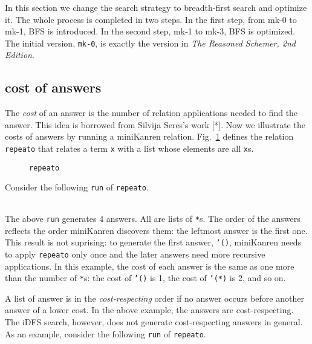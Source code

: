 \documentclass[format=acmlarge, review=true, authordraft=true]{acmart}
\begin{document}
In this section we change the search strategy to breadth-first search and optimize it. The whole process is completed in two steps. In the first step, from mk-0 to mk-1, BFS is introduced. In the second step, mk-1 to mk-3, BFS is optimized. The initial version, \texttt{mk-0}, is exactly the version in \emph{The Reasoned Schemer, 2nd Edition}.



\subsection{cost of answers}


The \emph{cost} of an answer is the number of relation applications needed to
find the answer. This idea is borrowed from Silvija Seres's work [*].
Now we illustrate the costs of answers by running a miniKanren relation.
Fig.~\ref{def-repeato} defines the relation \texttt{repeato} that 
relates a term \texttt{x} with a list whose elements are all \texttt{x}s.

\begin{figure}
  
  \caption{\texttt{repeato}}
  \label{def-repeato}
\end{figure}

Consider the following \texttt{run} of \texttt{repeato}.
\begin{center}
  \begin{tabular}{c}
  
   \end{tabular}
\end{center}

The above \texttt{run} generates 4 answers. All are lists of \texttt{*}s.
The order of the answers reflects the order miniKanren discovers them:
the leftmost answer is the first one. This result is not suprising:
to generate the first answer, \texttt{'()}, miniKanren needs to apply
\texttt{repeato} only once and the later answers need more recursive
applications. In this example, the cost of each answer is the same as
one more than the number of \texttt{*}s: the cost of \texttt{'()} is 1,
the cost of \texttt{'(*)} is 2, and so on.

A list of answer is in the \emph{cost-respecting} order if no answer occurs
before another answer of a lower cost. In the above example, the answers are
cost-respecting. The iDFS search, however, does not generate cost-respecting
answers in general. As an example, consider the following \texttt{run} of
\texttt{repeato}.
\begin{center}
  \begin{tabular}{c}
   
   \end{tabular}
\end{center}
\end{document}
